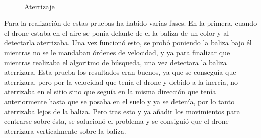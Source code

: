 \begin{figure}[H]
 \centering
	\\
 \caption{Aterrizaje}
 \label{f:Aterrizaje sobre el simulador}
\end{figure}


\hspace{1cm} Para la realizaci\'on de estas pruebas ha habido varias fases. En la primera, cuando el drone estaba en el aire se pon\'ia delante de el la baliza de un color y al detectarla aterrizaba. Una vez funcion\'o esto, se prob\'o poniendo la baliza bajo \'el mientras no se le mandaban \'ordenes de velocidad, y ya para finalizar que mientras realizaba el algoritmo de b\'usqueda, una vez detectara la baliza aterrizara. Esta prueba los resultados eran buenos, ya que se consegu\'ia que aterrizara, pero por la velocidad que ten\'ia el drone y debido a la inercia, no aterrizaba en el sitio sino que segu\'ia en la misma direcci\'on que ten\'ia anteriormente hasta que se posaba en el suelo y ya se deten\'ia, por lo tanto aterrizaba lejos de la baliza. Pero tras esto y ya añadir los movimientos para centrarse sobre \'esta, se solucion\'o el problema y se consigui\'o que el drone aterrizara verticalmente sobre la baliza. 


